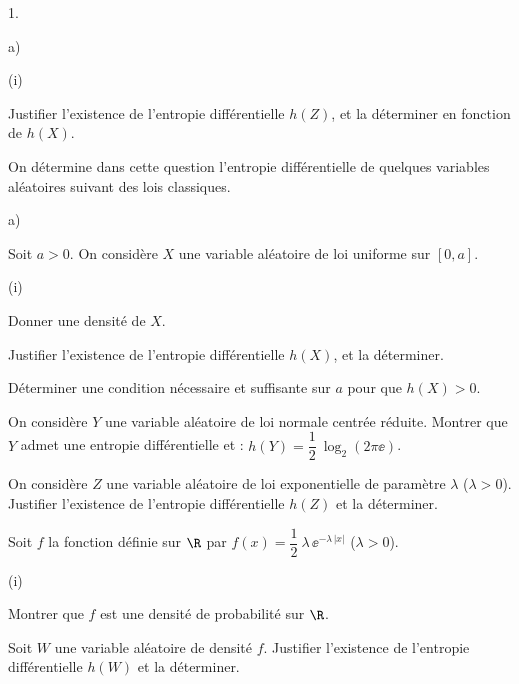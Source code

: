 \documentclass[11pt]{article}%
\begin{document}
\begin{noliste}{1.}
\begin{noliste}{a)}
\begin{nonoliste}{(i)}
    \item Justifier l'existence de l'entropie différentielle $h(Z)$,
      et la déterminer en fonction de $h(X)$.
    \end{nonoliste}
  \end{noliste}
  
\item On détermine dans cette question l'entropie différentielle de
  quelques variables aléatoires suivant des lois classiques.
  \begin{noliste}{a)}
    \setlength{\itemsep}{2mm}
  \item Soit $a>0$. On considère $X$ une variable aléatoire de loi
    uniforme sur $[0,a]$.
    \begin{nonoliste}{(i)}
      \setlength{\itemsep}{2mm}
    \item Donner une densité de $X$.
      
    \item Justifier l'existence de l'entropie différentielle $h(X)$,
      et la déterminer.
      
    \item Déterminer une condition nécessaire et suffisante sur $a$
      pour que $h(X)>0$.
    \end{nonoliste}


    \newpage
    
    
  \item On considère $Y$ une variable aléatoire de loi normale centrée
    réduite. Montrer que $Y$ admet une entropie différentielle et :
    $h(Y) = \dfrac{1}{2} \ \log_2(2 \pi \ee)$.
    
  \item On considère $Z$ une variable aléatoire de loi exponentielle
    de paramètre $\lambda$ ($\lambda >0$). Justifier l'existence de
    l'entropie différentielle $h(Z)$ et la déterminer.
    
  \item Soit $f$ la fonction définie sur $\R$ par $f(x) = \dfrac{1}{2}
    \ \lambda \, \ee^{-\lambda \, |x|}$ ($\lambda >0$).
    \begin{nonoliste}{(i)}
      \setlength{\itemsep}{2mm}
    \item Montrer que $f$ est une densité de probabilité sur $\R$.
      
    \item Soit $W$ une variable aléatoire de densité $f$. Justifier
      l'existence de l'entropie différentielle $h(W)$ et la déterminer.
    \end{nonoliste}
  \end{noliste}
  

\end{noliste}
\end{document}
